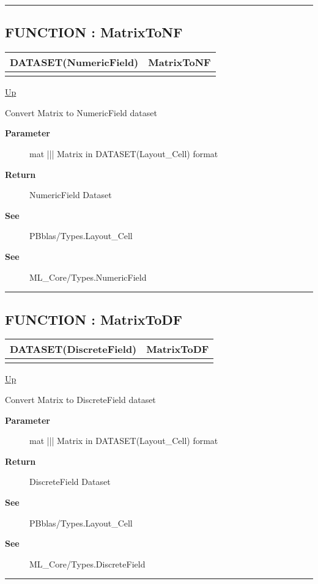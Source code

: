 \rule{\textwidth}{0.4pt}
\subsection*{FUNCTION : MatrixToNF}
\hypertarget{ecldoc:pbblas.converted.matrixtonf}{}

{\renewcommand{\arraystretch}{1.5}
\begin{tabularx}{\textwidth}{|>{\raggedright\arraybackslash}l|X|}
\hline
\hspace{0pt}DATASET(NumericField) & MatrixToNF \\
\hline
\multicolumn{2}{|>{\raggedright\arraybackslash}X|}{\hspace{0pt}(DATASET(Layout\_Cell) mat)} \\
\hline
\end{tabularx}
}

\hyperlink{ecldoc:PBblas.Converted}{Up}

\par
Convert Matrix to NumericField dataset

\par
\begin{description}
\item [\textbf{Parameter}] mat ||| Matrix in DATASET(Layout\_Cell) format
\item [\textbf{Return}] NumericField Dataset
\item [\textbf{See}] PBblas/Types.Layout\_Cell
\item [\textbf{See}] ML\_Core/Types.NumericField
\end{description}

\rule{\textwidth}{0.4pt}
\subsection*{FUNCTION : MatrixToDF}
\hypertarget{ecldoc:pbblas.converted.matrixtodf}{}

{\renewcommand{\arraystretch}{1.5}
\begin{tabularx}{\textwidth}{|>{\raggedright\arraybackslash}l|X|}
\hline
\hspace{0pt}DATASET(DiscreteField) & MatrixToDF \\
\hline
\multicolumn{2}{|>{\raggedright\arraybackslash}X|}{\hspace{0pt}(DATASET(Layout\_Cell) mat)} \\
\hline
\end{tabularx}
}

\hyperlink{ecldoc:PBblas.Converted}{Up}

\par
Convert Matrix to DiscreteField dataset

\par
\begin{description}
\item [\textbf{Parameter}] mat ||| Matrix in DATASET(Layout\_Cell) format
\item [\textbf{Return}] DiscreteField Dataset
\item [\textbf{See}] PBblas/Types.Layout\_Cell
\item [\textbf{See}] ML\_Core/Types.DiscreteField
\end{description}

\rule{\textwidth}{0.4pt}



